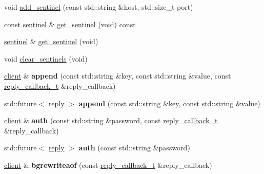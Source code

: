\begin{DoxyCompactItemize}
\item 
void \hyperlink{classcpp__redis_1_1client_a7050eb52856decad9ab2060a139f4b48}{add\+\_\+sentinel} (const std\+::string \&host, std\+::size\+\_\+t port)
\item 
const \hyperlink{classcpp__redis_1_1sentinel}{sentinel} \& \hyperlink{classcpp__redis_1_1client_a9f94860dad26bca4e860a56ca8aefe36}{get\+\_\+sentinel} (void) const
\item 
\hyperlink{classcpp__redis_1_1sentinel}{sentinel} \& \hyperlink{classcpp__redis_1_1client_a9457cea98f061ce6071f897ba8605813}{get\+\_\+sentinel} (void)
\item 
void \hyperlink{classcpp__redis_1_1client_a68cd15d1cc30302237e3a400e2ac43f5}{clear\+\_\+sentinels} (void)
\item 
\mbox{\label{classcpp__redis_1_1client_ad60647638d8758103e98894457652b84}} 
\hyperlink{classcpp__redis_1_1client}{client} \& {\bfseries append} (const std\+::string \&key, const std\+::string \&value, const \hyperlink{classcpp__redis_1_1client_a061a1140d36d2eaeda82b09a0bb3f9f2}{reply\+\_\+callback\+\_\+t} \&reply\+\_\+callback)
\item 
\mbox{\label{classcpp__redis_1_1client_a3e50dddad0b4c9eca58d970bdc4e78da}} 
std\+::future$<$ \hyperlink{classcpp__redis_1_1reply}{reply} $>$ {\bfseries append} (const std\+::string \&key, const std\+::string \&value)
\item 
\mbox{\label{classcpp__redis_1_1client_a3ee834ca9c0810d2eafcf04de9dc0670}} 
\hyperlink{classcpp__redis_1_1client}{client} \& {\bfseries auth} (const std\+::string \&password, const \hyperlink{classcpp__redis_1_1client_a061a1140d36d2eaeda82b09a0bb3f9f2}{reply\+\_\+callback\+\_\+t} \&reply\+\_\+callback)
\item 
\mbox{\label{classcpp__redis_1_1client_a899b98d4d6da0ffdf8780933fe088fd1}} 
std\+::future$<$ \hyperlink{classcpp__redis_1_1reply}{reply} $>$ {\bfseries auth} (const std\+::string \&password)
\item 
\mbox{\label{classcpp__redis_1_1client_a9873619c2c1ff820fde17e27ade096c8}} 
\hyperlink{classcpp__redis_1_1client}{client} \& {\bfseries bgrewriteaof} (const \hyperlink{classcpp__redis_1_1client_a061a1140d36d2eaeda82b09a0bb3f9f2}{reply\+\_\+callback\+\_\+t} \&reply\+\_\+callback)

\end{DoxyCompactItemize}
